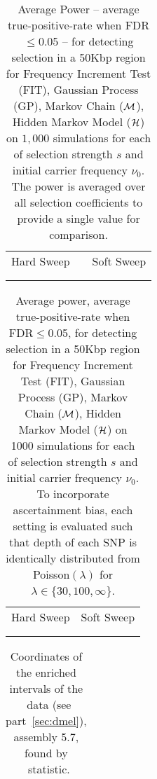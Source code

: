 \begin{table}[h]
	\centering
	\begin{tabular}{ccc}
		Hard Sweep & &Soft Sweep\\ \\  
		
		&&
	\end{tabular}
        \caption{Average Power -- average true-positive-rate when FDR$\le$0.05 
        -- for detecting selection in a 50Kbp region for Frequency Increment 
        Test (FIT), Gaussian Process (GP), Markov Chain (${\cal M}$), Hidden Markov 
        Model (${\cal H}$) on $1,000$ simulations for each of selection strength $s$ 
        and initial carrier frequency $\nu_0$. The power is averaged over all 
        selection coefficients to provide a single value for comparison.}
\label{tab:power}
\end{table}
\clearpage
\newpage
\begin{table}[H]
	\begin{tabular}{c||c}
		Hard Sweep & Soft Sweep\\ \\  
		
				&
	\end{tabular}
	\caption{Average power, average true-positive-rate when FDR$\le$0.05, for 
	detecting selection in a 50Kbp region for Frequency Increment Test (FIT), 
	Gaussian Process (GP), Markov Chain (${\cal M}$), Hidden Markov Model (${\cal H}$) on 
	1000 
		simulations for each of selection strength $s$ and initial 
		carrier frequency $\nu_0$. To incorporate ascertainment bias, each 
		setting is evaluated such that depth of each SNP is identically 
		distributed from Poisson$(\lambda)$ for $\lambda \in 
		\{30,100,\infty\}$.}\label{tab:powerCLR}
\end{table}


\begin{table}[h]
	\centering
	\begin{tabular}{c}
		
	\end{tabular}
	\caption{Coordinates of the enriched intervals of the \data\ data (see 
	part~\ref{sec:dmel}), assembly 
	5.7, found by \comale\ statistic.}\label{tab:intervals}
\end{table}